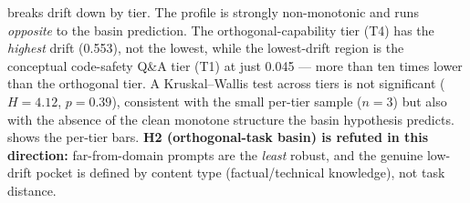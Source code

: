  breaks drift down by tier. The profile is strongly non-monotonic and
runs \emph{opposite} to the basin prediction. The orthogonal-capability tier (T4) has the
\emph{highest} drift (0.553), not the lowest, while the lowest-drift region is the
conceptual code-safety Q\&A tier (T1) at just 0.045 --- more than ten times lower than the
orthogonal tier. A Kruskal--Wallis test across tiers is not significant
($H=4.12$, $p=0.39$), consistent with the small per-tier sample ($n=3$) but also with the
absence of the clean monotone structure the basin hypothesis predicts.
 shows the per-tier bars. {\bf H2 (orthogonal-task basin) is
refuted in this direction:} far-from-domain prompts are the \emph{least} robust, and the
genuine low-drift pocket is defined by content type (factual/technical knowledge), not task
distance.

\begin{table}[t]
    \centering
    \caption{Drift by tier for the adversarial and benign runs, and their difference
    (intent effect). Lowest-drift tier in \textbf{bold}; highest-drift tier underlined. The
    orthogonal tier (T4) drifts most and the code-safety tier (T1) least --- the reverse of
    the basin prediction. Critically, every per-tier intent difference is $\le 0.061$ and
    the global means are nearly identical, so drift is not intent-specific.}
    \label{tab:tier_drift}
\end{table}

